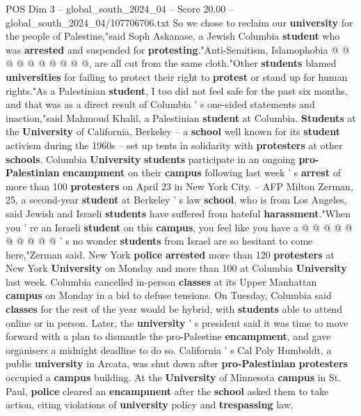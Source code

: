 \begin{textsample}{POS Dim 3 – global\_south\_2024\_04 – Score 20.00 – global\_south\_2024\_04/107706706.txt}
So we chose to reclaim our \textbf{university} for the people of Palestine,"said Soph Askanase, a Jewish Columbia \textbf{student} who was \textbf{arrested} and suspended for \textbf{protesting}."Anti-Semitism, Islamophobia @ @ @ @ @ @ @ @ @ @, are all cut from the same cloth."Other \textbf{students} blamed \textbf{universities} for failing to protect their right to \textbf{protest} or stand up for human rights."As a Palestinian \textbf{student}, I too did not feel safe for the past six months, and that was as a direct result of Columbia ' s one-sided statements and inaction,"said Mahmoud Khalil, a Palestinian \textbf{student} at Columbia. \textbf{Students} at the \textbf{University} of California, Berkeley -- a \textbf{school} well known for its \textbf{student} activism during the 1960s -- set up tents in solidarity with \textbf{protesters} at other \textbf{schools}.
Columbia \textbf{University} \textbf{students} participate in an ongoing \textbf{pro-Palestinian} \textbf{encampment} on their \textbf{campus} following last week ' s \textbf{arrest} of more than 100 \textbf{protesters} on April 23 in New York City. -- AFP Milton Zerman, 25, a second-year \textbf{student} at Berkeley ' s law \textbf{school}, who is from Los Angeles, said Jewish and Israeli \textbf{students} have suffered from hateful \textbf{harassment}."When you ' re an Israeli \textbf{student} on this \textbf{campus}, you feel like you have a @ @ @ @ @ @ @ @ @ @ ' s no wonder \textbf{students} from Israel are so hesitant to come here,"Zerman said.
New York \textbf{police} \textbf{arrested} more than 120 \textbf{protesters} at New York \textbf{University} on Monday and more than 100 at Columbia \textbf{University} last week.
Columbia cancelled in-person \textbf{classes} at its Upper Manhattan \textbf{campus} on Monday in a bid to defuse tensions.
On Tuesday, Columbia said \textbf{classes} for the rest of the year would be hybrid, with \textbf{students} able to attend online or in person.
Later, the \textbf{university} ' s president said it was time to move forward with a plan to dismantle the pro-Palestine \textbf{encampment}, and gave organisers a midnight deadline to do so.
California ' s Cal Poly Humboldt, a public \textbf{university} in Arcata, was shut down after \textbf{pro-Palestinian} \textbf{protesters} occupied a \textbf{campus} building.
At the \textbf{University} of Minnesota \textbf{campus} in St.
Paul, \textbf{police} cleared an \textbf{encampment} after the \textbf{school} asked them to take action, citing violations of \textbf{university} policy and \textbf{trespassing} law.

\end{textsample}
